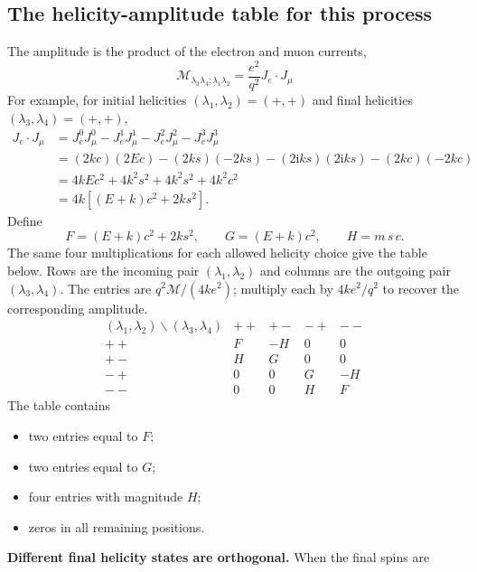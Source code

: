 \documentclass[12pt,a4paper]{article}
\numberwithin{equation}{section}
\newcommand{\M}{\mathcal M}
\newcommand{\ii}{\mathrm i}
\begin{document}
\subsection{The helicity-amplitude table for this process}
The amplitude is the product of the electron and muon currents, 
\begin{equation}
      \M_{\lambda_3\lambda_4;\lambda_1\lambda_2}
      =\frac{e^2}{q^2}J_e\!\cdot J_\mu
\end{equation}
For example, for initial helicities $(\lambda_1,\lambda_2)=(+,+)$ and final
helicities $(\lambda_3,\lambda_4)=(+,+)$,
\begin{align}
 J_e\!\cdot J_\mu
 &=J_e^0J_\mu^0-J_e^1J_\mu^1-J_e^2J_\mu^2-J_e^3J_\mu^3\\
 &=(2kc)(2Ec)-(2ks)(-2ks)-(2\ii ks)(2\ii ks)
       -(2kc)(-2kc)\\
 &=4kEc^2+4k^2s^2+4k^2s^2+4k^2c^2\\
 &=4k\left[(E+k)c^2+2ks^2\right].
\end{align}
Define
\begin{equation}
 F=(E+k)c^2+2ks^2,\qquad G=(E+k)c^2,\qquad H=m\,s\,c.
\end{equation}
The same four multiplications for each allowed helicity choice give the table
below. Rows are the incoming pair $(\lambda_1,\lambda_2)$ and columns are
the outgoing pair $(\lambda_3,\lambda_4)$. The entries are $q^2\M/(4ke^2)$; multiply each by $4ke^2/q^2$ to recover the corresponding amplitude. 
\begin{equation}
\renewcommand{\arraystretch}{1.25}
\begin{array}{c|cccc}
 (\lambda_1,\lambda_2)\backslash(\lambda_3,\lambda_4)
 &++&+-&-+&--\\ \hline
 ++&F&-H&0&0\\
 +-&H&G&0&0\\
 -+&0&0&G&-H\\
 --&0&0&H&F
\end{array}
 \label{eq:helicity-table}
\end{equation}
The table contains
\begin{itemize}
 \item two entries equal to $F$;
 \item two entries equal to $G$;
 \item four entries with magnitude $H$;
 \item zeros in all remaining positions.
\end{itemize}
\textbf{Different final helicity states are orthogonal. }When the final spins are
\end{document}
